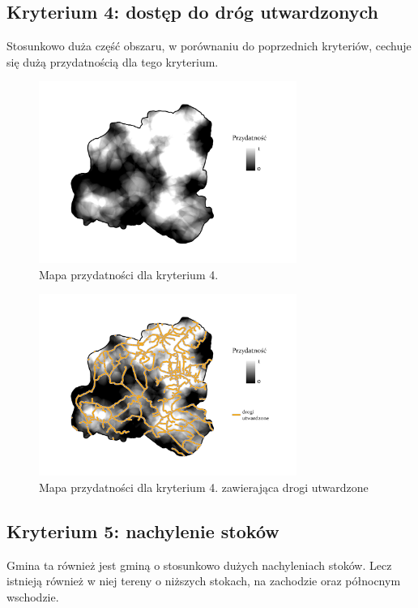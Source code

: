 \documentclass{article}
\begin{document}
\subsection{Kryterium 4: dostęp do dróg utwardzonych}
Stosunkowo duża część obszaru, w porównaniu do poprzednich kryteriów, cechuje się dużą przydatnością dla tego kryterium.

\begin{figure}[H]
    \centering
    \includegraphics[width=0.75\textwidth]{img/plesna-kryterium4-layout.jpg}
    \caption{Mapa przydatności dla kryterium 4.}
\end{figure}

\begin{figure}[H]
    \centering
    \includegraphics[width=0.75\textwidth]{img/plesna-kryterium4-drogi.jpg}
    \caption{Mapa przydatności dla kryterium 4. zawierająca drogi utwardzone}
\end{figure}

\subsection{Kryterium 5: nachylenie stoków}
Gmina ta również jest gminą o stosunkowo dużych nachyleniach stoków. Lecz istnieją również w niej tereny o niższych stokach, na zachodzie oraz północnym wschodzie.
\end{document}
